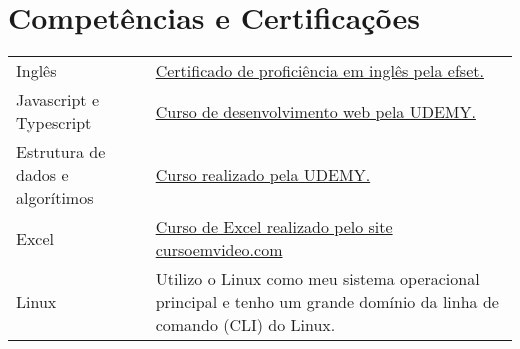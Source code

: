 \documentclass[a4paper,12pt]{article}
\begin{document}
\section{Competências e Certificações}
\begin{tabularx}{\linewidth}{@{}l X@{}}
Inglês &  \normalsize{\href{https://cert.efset.org/KdGLiQ}{Certificado de proficiência em inglês pela efset.}}\\
Javascript e Typescript  &  \normalsize{\href{https://udemy-certificate.s3.amazonaws.com/image/UC-6fc7d4af-701d-446a-b69b-8e167018a749.jpg?v=1706800581000}{Curso de desenvolvimento web pela UDEMY.}}\\  
Estrutura de dados e algorítimos &  \normalsize{\href{https://udemy-certificate.s3.amazonaws.com/image/UC-7074fe91-0541-4bfd-bc58-af41912a6361.jpg?v=1703254492000}{Curso realizado pela UDEMY.}}\\  
Excel & \normalsize{\href{https://www.cursoemvideo.com/validacao-de-certificado/?codigo=798CE-654D-9}{Curso de Excel realizado pelo site cursoemvideo.com}}\\  
Linux & \normalsize{Utilizo o Linux como meu sistema operacional principal e tenho um grande domínio da linha de comando (CLI) do Linux.}\\  
\end{tabularx}

\vfill
\end{document}
